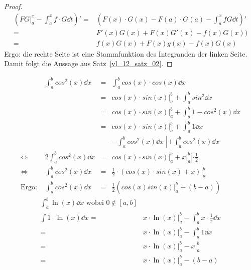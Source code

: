\begin{proof}
	\begin{align*}
		\left( FG|_a^x - \int_a^x f \cdot G \dd{t} \right)' = &
		\left(F(x) \cdot G(x) - F(a) \cdot G(a) - \int_a^x fG \dd{t} \right)' \\
		= & F'(x)G(x) + F(x)G'(x) - f(x)G(x)) \\
		= & f(x)G(x) + F(x)g(x) -f(x)G(x)
	\end{align*}
	Ergo: die rechte Seite ist eine Stammfunktion des Integranden der 
	linken Seite. Damit folgt die Aussage aus Satz~\ref{vl_12_satz_02}.
\end{proof}

\begin{Beispiel}{
	\begin{align*}
		& \int_a^b cos^2(x) \dd{x} & = &  \int_a^b cos(x) \cdot cos(x) \dd{x} \\
		& &  = & \left. cos(x) \cdot sin(x) \right\vert_a^b + 
			\int_a^b sin^2 \dd{x} \\
		& & = & \left. cos(x) \cdot sin(x) \right\vert_a^b + 
			\int_a^b 1 - cos^2(x) \dd{x} \\
		& & = & \left. cos(x) \cdot sin(x) \right\vert_a^b 
			+ \int_a^b 1 \dd{x} \\
		& & & - \int_a^b cos^2(x) \dd{x} 
			 \; \left\vert + \int_a^b cos^2(x) \dd{x} \right. \\
	 \Leftrightarrow 
	 & 2 \int_a^b cos^2(x) \dd{x} & = & \left. cos(x) \cdot sin(x) \right\vert_a^b 
	 	+ \left. x \right\vert_a^b  \left\vert \cdot \frac{1}{2} \right. \\
	 \Leftrightarrow
	& \int_a^b cos^2(x) \dd{x} & = & \frac{1}{2} \cdot 
		\left. \left( cos(x) \cdot sin(x) + x\right) \right\vert_a^b \\
	\text{Ergo: } & \int_a^b cos^2(x) \dd{x} & = & \frac{1}{2} (cos(x) sin(x) 
		\vert_a^b + (b-a))
	\end{align*}
	\begin{align*}
		\int_a^b \ln (x) \dd{x} \text{ wobei } 0 \not\in [a,b] \\
		\int 1 \cdot \ln (x) \dd{x} = & x \cdot \ln (x)\vert_a^b - 
		\int_a^b x \cdot \frac{1}{x} \dd{x} \\
		= & \left. x \cdot \ln (x) \right\vert_a^b - \int_a^b 1 \dd{x} \\
		= & \left. x \cdot \ln (x)\right\vert_a^b - \left. x\right\vert_a^b \\
		= & \left. x \cdot \ln (x)\right\vert_a^b - (b - a)
	\end{align*}
}\end{Beispiel}

